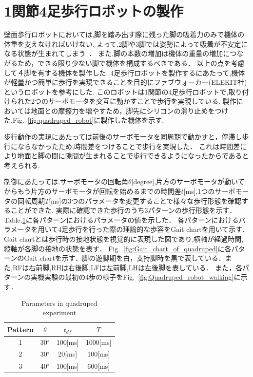 \documentclass[uplatex,dvipdfmx]{jlreq}
\begin{document}
\section{1関節4足歩行ロボットの製作}
壁面歩行ロボットにおいては,脚を踏み出す際に残った脚の吸着力のみで機体の体重を支えなければいけない.
よって,2脚や3脚では姿勢によって吸着が不安定になる状態が生まれてしまう~\cite{広瀬茂男1991四足壁面移動ロボット}．
また,脚の本数の増加は機体の重量の増加につながるため，できる限り少ない脚で機体を構成するべきである．
以上の点を考慮して４脚を有する機体を製作した.
4足歩行ロボットを製作するにあたって,機体が軽量かつ簡単に歩行を実現できることを目的にファブウォーカー(ELEKIT社)というロボットを参考にした.
このロボットは1関節の4足歩行ロボットで,取り付けられた2つのサーボモータを交互に動かすことで歩行を実現している.
製作においては地面との摩擦力を増やすため，脚先にシリコンの滑り止めをつけた.Fig.~\ref{fig:quadruped_robot}に製作した機体を示す.

歩行動作の実現にあたっては前後のサーボモータを同周期で動かすと，停滞し歩行にならなかったため,時間差をつけることで歩行を実現した．
これは時間差により地面と脚の間に隙間が生まれることで歩行できるようになったからであると考えられる.

制御にあたっては,サーボモータの回転角$\theta$[degree],片方のサーボモータが動いてからもう片方のサーボモータが回転を始めるまでの時間差$t$[ms],1つのサーボモータの回転周期$T$[ms]の3つのパラメータを変更することで様々な歩行形態を確認することができた.
実際に確認できた歩行のうち3パターンの歩行形態を示す．
Table.\ref{table:Parameters_in_quadruped_experiment}に各パターンにおけるパラメータの値を示した．
各パターンにおけるパラメータを用いて4足歩行を行った際の理論的な歩容をGait chartを用いて示す．
Gait chartとは歩行時の接地状態を視覚的に表現した図であり,横軸が経過時間,縦軸が各脚の接地の状態を表す．
Fig.~\ref{fig:Gait_chart_of_quadruped}に各パターンのGait chartを示す．脚の遊脚期を白，支持脚時を黒で表している．また,RFは右前脚,RHは右後脚,LFは左前脚,LHは左後脚を表している．
また，各パターンの実機実験の最初の4歩の様子をFig.~\ref{fig:Quadruped_robot_walking}に示す．


\begin{table}
    \caption{Parameters in quadruped experiment}
     \label{table:Parameters_in_quadruped_experiment}
     \centering
     \begin{tabular}{cccc}\hline
      Pattern & $\theta$ & $t_{df}$ & $T$ \\ \hline 
     1 & 30$^\circ$ & 100[ms] & 1000[ms] \\ 
     2 & 30$^\circ$ & 20[ms] & 100[ms] \\ 
     3 & 40$^\circ$ & 100[ms] & 600[ms] \\ \hline    
     \end{tabular}
  \end{table}
\end{document}
